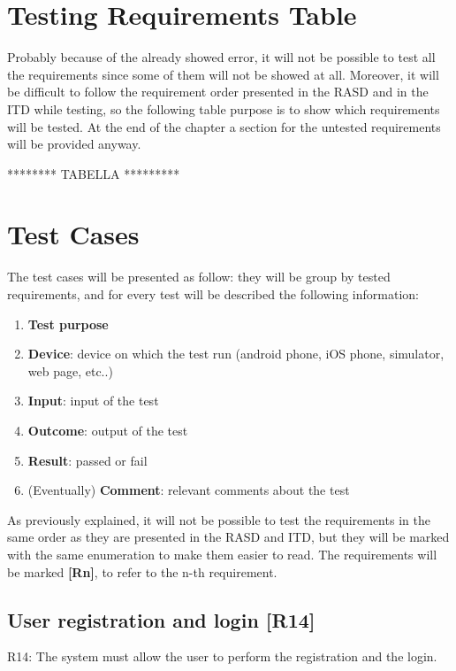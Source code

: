 \documentclass[../ATD.tex]{subfiles}
\begin{document}
    \section{Testing Requirements Table}\label{sec:testing-requirements-table}
    Probably because of the already showed error, it will not be possible to test all the requirements since some of them will not be showed at all.
    Moreover, it will be difficult to follow the requirement order presented in the RASD and in the ITD while testing, so the following table purpose is to show which requirements will be tested.
    At the end of the chapter a section for the untested requirements will be provided anyway.

    ******** TABELLA *********

    \section{Test Cases}\label{sec:test-cases}
    The test cases will be presented as follow: they will be group by tested requirements, and for every test will be described the following information:
    \begin{enumerate}
        \item \textbf{Test purpose}
        \item \textbf{Device}: device on which the test run (android phone, iOS phone, simulator, web page, etc..)
        \item \textbf{Input}: input of the test
        \item \textbf{Outcome}: output of the test
        \item \textbf{Result}: passed or fail
        \item (Eventually) \textbf{Comment}: relevant comments about the test
    \end{enumerate}
    As previously explained, it will not be possible to test the requirements in the same order as they are presented in the RASD and ITD,
    but they will be marked with the same enumeration to make them easier to read.
    The requirements will be marked \textbf{[Rn]}, to refer to the n-th requirement.

    \subsection{User registration and login [R14]}\label{subsec:user-registration-and-login}
    R14: The system must allow the user to perform the registration and the login.
\end{document}
